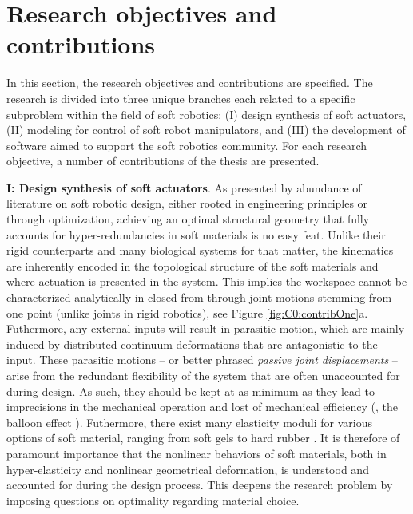 \clearpage
\section{Research objectives and contributions}
In this section, the research objectives and contributions are specified. The research is divided into three unique branches each related to a specific subproblem within the field of soft robotics: (I) design synthesis of soft actuators, (II) modeling for control of soft robot manipulators, and (III) the development of software aimed to support the soft robotics community. For each research objective, a number of contributions of the thesis are presented. 
\vspace{1mm}

\par \textbf{I: Design synthesis of soft actuators}. As presented by abundance of literature on soft robotic design, either rooted in engineering principles or through optimization, achieving an optimal structural geometry that fully accounts for hyper-redundancies in soft materials is no easy feat. Unlike their rigid counterparts and many biological systems for that matter, the kinematics are inherently encoded in the topological structure of the soft materials and where actuation is presented in the system. This implies the workspace cannot be characterized analytically in closed from through joint motions stemming from one point (unlike joints in rigid robotics), see Figure \ref{fig:C0:contribOne}a. Futhermore, any external inputs will result in parasitic motion, which are mainly induced by distributed continuum deformations that are antagonistic to the input. These parasitic motions -- or better phrased \textit{passive joint displacements} -- arise from the redundant flexibility of the system that are often unaccounted for during design. As such, they should be kept at as minimum as they lead to imprecisions in the mechanical operation and lost of mechanical efficiency (\eg, the balloon effect \cite{Daerden1999}). Futhermore, there exist many elasticity moduli for various options of soft material, ranging from soft gels to hard rubber \cite{Rus2015}. It is therefore of paramount importance that the nonlinear behaviors of soft materials, both in hyper-elasticity and nonlinear geometrical deformation, is understood and accounted for during the design process. This deepens the research problem by imposing questions on optimality regarding material choice.

